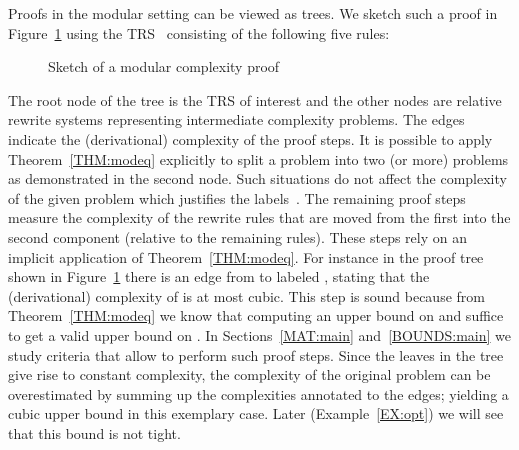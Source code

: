 \documentclass{LMCS}
\theoremstyle{plain}\newtheorem{mainthm}[thm]{Main Theorem}
\begin{document}
\begin{exa}
\label{EX:reverse}
Proofs in the modular setting can be viewed as trees. We sketch such a proof
in Figure~\ref{FIG:sketch} using the TRS~ consisting of the following
five rules:

\begin{figure}
\caption{Sketch of a modular complexity proof}
\label{FIG:sketch}
\end{figure}The root node of the tree is the TRS of interest and the other nodes are
relative rewrite systems representing intermediate
complexity problems. The edges indicate the (derivational) complexity of
the proof steps.  It is possible to apply Theorem~\ref{THM:modeq}
explicitly to split a problem into two (or more) problems as demonstrated
in the second node.  Such situations do not affect the complexity of the
given problem which justifies the labels~.  The remaining proof
steps measure the complexity of the rewrite rules that are moved from the
first into the second component (relative to the remaining rules).
These steps rely on an implicit application of Theorem~\ref{THM:modeq}.
For instance in the proof tree shown in Figure~\ref{FIG:sketch} there is an
edge from  to  labeled
, stating that the (derivational) complexity of
 is at most cubic. This step is sound because
from Theorem~\ref{THM:modeq} we know that computing an upper bound on
 and  suffice to get
a valid upper bound on .  In
Sections~\ref{MAT:main} and~\ref{BOUNDS:main} we study criteria that
allow to perform such proof steps.  Since the leaves in the tree give
rise to constant complexity, the complexity of the original problem can
be overestimated by summing up the complexities annotated to the edges;
yielding a cubic upper bound in this exemplary case. Later
(Example~\ref{EX:opt}) we will see that this bound is not tight.
\end{exa}
\end{document}
